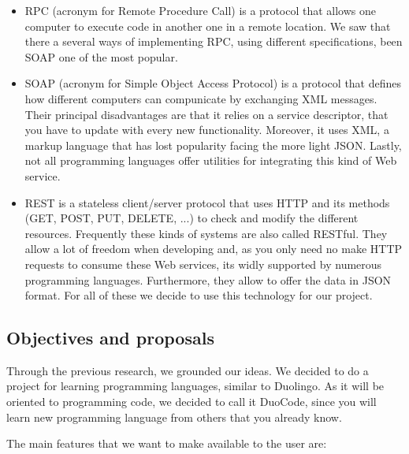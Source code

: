 \begin{itemize}
\item
RPC (acronym for Remote Procedure Call) is a protocol that allows one computer to execute code in another one in a remote location. We saw that there a several ways of implementing RPC, using different specifications, been SOAP one of the most popular.

\item
SOAP (acronym for Simple Object Access Protocol) is a protocol that defines how different computers can compunicate by exchanging XML messages. Their principal disadvantages are that it relies on a service descriptor, that you have to update with every new functionality. Moreover, it uses XML, a markup language that has lost popularity facing the more light JSON. Lastly, not all programming languages offer utilities for integrating this kind of Web service.

\item
REST is a stateless client/server protocol that uses HTTP and its methods (GET, POST, PUT, DELETE, ...) to check and modify the different resources. Frequently these kinds of systems are also called RESTful. They allow a lot of freedom when developing and, as you only need no make HTTP requests to consume these Web services, its widly supported by numerous programming languages. Furthermore, they allow to offer the data in JSON format. For all of these we decide to use this technology for our project.

\end{itemize}

\subsection{Objectives and proposals\label{subsec:proposals}}

Through the previous research, we grounded our ideas. We decided to do a project for learning programming languages, similar to Duolingo. As it will be oriented to programming code, we decided to call it DuoCode, since you will learn new programming language from others that you already know.

The main features that we want to make available  to the user are:

